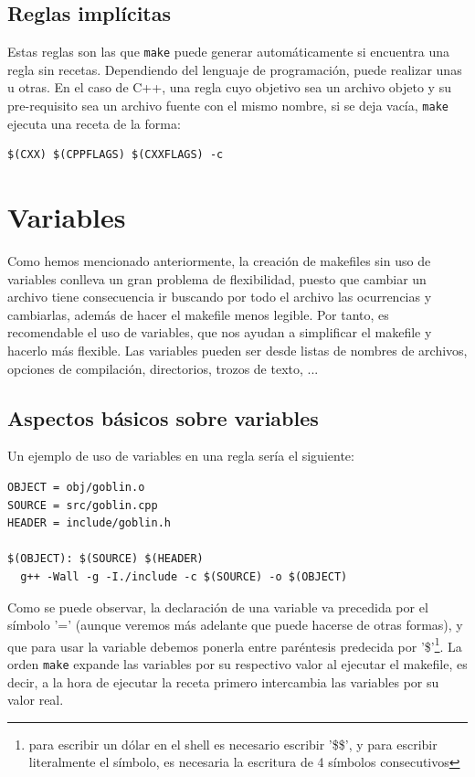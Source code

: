 \documentclass[11pt,twoside,titlepage,a4paper]{article}
\theoremstyle{definition}
\theoremstyle{plain_rojo}
\theoremstyle{remark}
\begin{document}
\subsection{Reglas implícitas}

Estas reglas son las que \texttt{make} puede generar automáticamente si 
encuentra una regla sin recetas. Dependiendo del lenguaje de programación, 
puede realizar unas u otras. En el caso de C++, una regla cuyo objetivo sea 
un archivo objeto y su pre-requisito sea un archivo fuente con el mismo 
nombre, si se deja vacía, \texttt{make} ejecuta una receta de la forma:
\bigskip
\begin{lstlisting}
$(CXX) $(CPPFLAGS) $(CXXFLAGS) -c
\end{lstlisting}


\newpage
\section{Variables}

Como hemos mencionado anteriormente, la creación de makefiles sin uso de 
variables conlleva un gran problema de flexibilidad, puesto que cambiar un 
archivo tiene consecuencia ir buscando por todo el archivo las ocurrencias y 
cambiarlas, además de hacer el makefile menos legible. Por tanto, es 
recomendable el uso de variables, que nos ayudan a simplificar el makefile y 
hacerlo más flexible. Las variables pueden ser desde listas de nombres de 
archivos, opciones de compilación, directorios, trozos de texto, ... 

\subsection{Aspectos básicos sobre variables}

Un ejemplo de uso de variables en una regla sería el siguiente:
\bigskip
\begin{lstlisting}
OBJECT = obj/goblin.o
SOURCE = src/goblin.cpp
HEADER = include/goblin.h

$(OBJECT): $(SOURCE) $(HEADER)
  g++ -Wall -g -I./include -c $(SOURCE) -o $(OBJECT)
\end{lstlisting}
\bigskip

Como se puede observar, la declaración de una variable va precedida por el 
símbolo '=' (aunque veremos más adelante que puede hacerse de otras formas), 
y que para usar la variable debemos ponerla entre paréntesis predecida por 
'\$'\footnote{para escribir un dólar en el shell es necesario escribir 
'\$\$', y para escribir literalmente el símbolo, es necesaria la escritura de 
4 símbolos consecutivos}. La orden \texttt{make} expande las variables por su 
respectivo valor al ejecutar el makefile, es decir, a la hora de ejecutar la 
receta primero intercambia las variables por su valor real. 
\\
\end{document}
